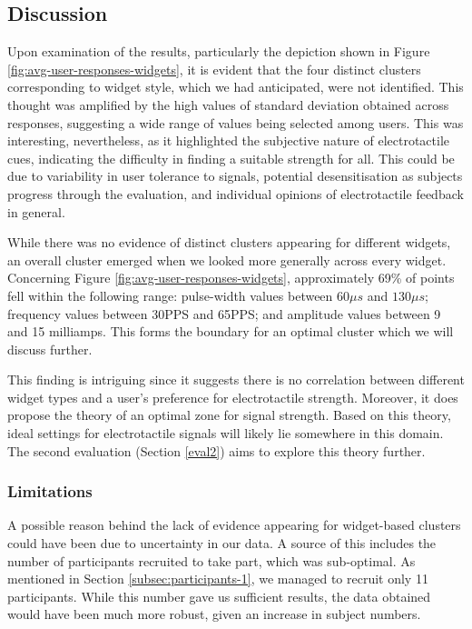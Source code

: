\documentclass{mpaper}
\begin{document}
\subsection{Discussion} \label{discussion-1}
Upon examination of the results, particularly the depiction shown in Figure \ref{fig:avg-user-responses-widgets}, it is evident that 
the four distinct clusters corresponding to widget style, which we had anticipated, were not identified. This thought was amplified by the high values of standard deviation obtained across responses, suggesting a wide range of values being selected among users. This was interesting, nevertheless, as it highlighted the subjective nature of electrotactile cues, indicating the difficulty in finding a suitable strength for all. This could be due to variability in user tolerance to signals, potential desensitisation as subjects progress through the evaluation, and individual opinions of electrotactile feedback in general.

While there was no evidence of distinct clusters appearing for different widgets, an overall cluster emerged when we looked more generally across every widget. Concerning Figure \ref{fig:avg-user-responses-widgets}, approximately 69\% of points fell within the following range: pulse-width values between $60{\mu}s$ and $130{\mu}s$; frequency values between 30PPS and 65PPS; and amplitude values between 9 and 15 milliamps. This forms the boundary for an optimal cluster which we will discuss further.

This finding is intriguing since it suggests there is no correlation between different widget types and a user's preference for electrotactile strength. Moreover, it does propose the theory of an optimal zone for signal strength. Based on this theory, ideal settings for electrotactile signals will likely lie somewhere in this domain. The second evaluation (Section \ref{eval2}) aims to explore this theory further.\\ 

\subsubsection{Limitations}
A possible reason behind the lack of evidence appearing for widget-based clusters could have been due to uncertainty in our data. A source of this includes the number of participants recruited to take part, which was sub-optimal. As mentioned in Section \ref{subsec:participants-1}, we managed to recruit only 11 participants. While this number gave us sufficient results, the data obtained would have been much more robust, given an increase in subject numbers. 
\end{document}
